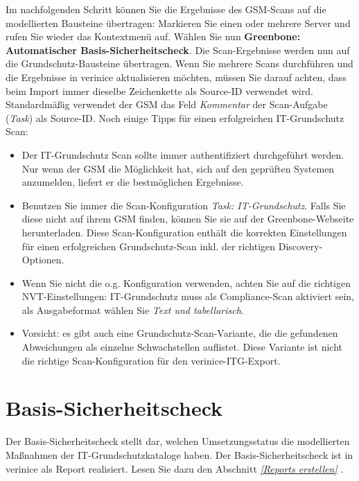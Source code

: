 \documentclass[a4paper,10pt]{book}
\begin{document}
 Im nachfolgenden Schritt können Sie die Ergebnisse des GSM-Scans auf die modellierten Bausteine übertragen:
 Markieren Sie einen oder mehrere Server und
 rufen Sie wieder das Kontextmenü auf. Wählen Sie nun \textbf{Greenbone: Automatischer Basis-Sicherheitscheck}. Die Scan-Ergebnisse werden nun auf die Grundschutz-Bausteine übertragen.
Wenn Sie mehrere Scans durchführen und die Ergebnisse in verinice aktualisieren möchten, müssen Sie darauf achten, dass beim Import immer dieselbe Zeichenkette als Source-ID verwendet wird. Standardmäßig verwendet der GSM das Feld {\em Kommentar} der Scan-Aufgabe ({\em Task}) als Source-ID.
Noch einige Tipps für einen erfolgreichen IT-Grundschutz Scan:
 \begin{itemize}
    \item Der IT-Grundschutz Scan sollte immer authentifiziert durchgeführt werden. Nur wenn der GSM die Möglichkeit hat, sich auf den geprüften Systemen anzumelden, liefert er die bestmöglichen Ergebnisse.
    \item Benutzen Sie immer die Scan-Konfiguration {\em Task: IT-Grundschutz}. Falls Sie diese nicht auf ihrem GSM finden, können Sie sie auf der Greenbone-Webseite herunterladen. Diese Scan-Konfiguration enthält die korrekten Einstellungen für einen erfolgreichen Grundschutz-Scan inkl. der richtigen Discovery-Optionen.
    \item Wenn Sie nicht die o.g. Konfiguration verwenden, achten Sie auf die richtigen NVT-Einstellungen: IT-Grundschutz muss als Compliance-Scan aktiviert sein, als Ausgabeformat wählen Sie {\em Text und tabellarisch}.
    \item Vorsicht: es gibt auch eine Grundschutz-Scan-Variante, die die gefundenen Abweichungen als einzelne Schwachstellen auflistet. Diese Variante ist nicht die richtige Scan-Konfiguration für den verinice-ITG-Export.
 \end{itemize}

\section{Basis-Sicherheitscheck}
Der Basis-Sicherheitscheck stellt dar, welchen Umsetzungsstatus die modellierten Maßnahmen der
IT-Grundschutzkataloge haben. Der Basis-Sicherheitscheck ist in verinice als Report realisiert.
Lesen Sie dazu den Abschnitt {\em \ref{Reports erstellen} }.
\end{document}
